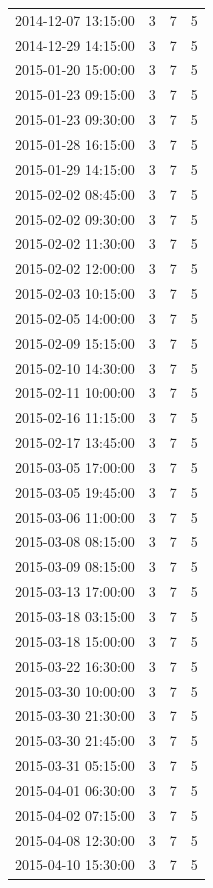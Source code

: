 \begin{tabular}{lrrr}
2014-12-07 13:15:00 & 3 & 7 & 5 \\
2014-12-29 14:15:00 & 3 & 7 & 5 \\
2015-01-20 15:00:00 & 3 & 7 & 5 \\
2015-01-23 09:15:00 & 3 & 7 & 5 \\
2015-01-23 09:30:00 & 3 & 7 & 5 \\
2015-01-28 16:15:00 & 3 & 7 & 5 \\
2015-01-29 14:15:00 & 3 & 7 & 5 \\
2015-02-02 08:45:00 & 3 & 7 & 5 \\
2015-02-02 09:30:00 & 3 & 7 & 5 \\
2015-02-02 11:30:00 & 3 & 7 & 5 \\
2015-02-02 12:00:00 & 3 & 7 & 5 \\
2015-02-03 10:15:00 & 3 & 7 & 5 \\
2015-02-05 14:00:00 & 3 & 7 & 5 \\
2015-02-09 15:15:00 & 3 & 7 & 5 \\
2015-02-10 14:30:00 & 3 & 7 & 5 \\
2015-02-11 10:00:00 & 3 & 7 & 5 \\
2015-02-16 11:15:00 & 3 & 7 & 5 \\
2015-02-17 13:45:00 & 3 & 7 & 5 \\
2015-03-05 17:00:00 & 3 & 7 & 5 \\
2015-03-05 19:45:00 & 3 & 7 & 5 \\
2015-03-06 11:00:00 & 3 & 7 & 5 \\
2015-03-08 08:15:00 & 3 & 7 & 5 \\
2015-03-09 08:15:00 & 3 & 7 & 5 \\
2015-03-13 17:00:00 & 3 & 7 & 5 \\
2015-03-18 03:15:00 & 3 & 7 & 5 \\
2015-03-18 15:00:00 & 3 & 7 & 5 \\
2015-03-22 16:30:00 & 3 & 7 & 5 \\
2015-03-30 10:00:00 & 3 & 7 & 5 \\
2015-03-30 21:30:00 & 3 & 7 & 5 \\
2015-03-30 21:45:00 & 3 & 7 & 5 \\
2015-03-31 05:15:00 & 3 & 7 & 5 \\
2015-04-01 06:30:00 & 3 & 7 & 5 \\
2015-04-02 07:15:00 & 3 & 7 & 5 \\
2015-04-08 12:30:00 & 3 & 7 & 5 \\
2015-04-10 15:30:00 & 3 & 7 & 5 \\

\end{tabular}
